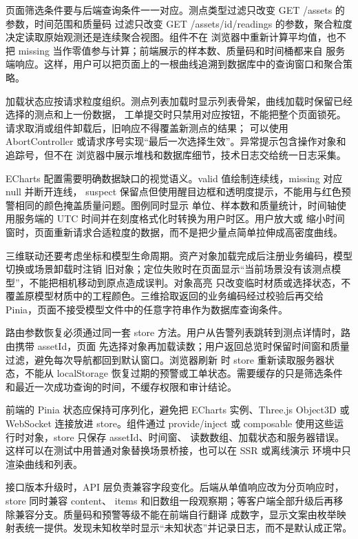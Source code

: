 页面筛选条件要与后端查询条件一一对应。测点类型过滤只改变 GET /assets 的参数，时间范围和质量码
过滤只改变 GET /assets/{id}/readings 的参数，聚合粒度决定读取原始观测还是连续聚合视图。组件不在
浏览器中重新计算平均值，也不把 missing 当作零值参与计算；前端展示的样本数、质量码和时间桶都来自
服务端响应。这样，用户可以把页面上的一根曲线追溯到数据库中的查询窗口和聚合策略。

加载状态应按请求粒度组织。测点列表加载时显示列表骨架，曲线加载时保留已经选择的测点和上一份数据，
工单提交时只禁用对应按钮，不能把整个页面锁死。请求取消或组件卸载后，旧响应不得覆盖新测点的结果；
可以使用 AbortController 或请求序号实现“最后一次选择生效”。异常提示包含操作对象和追踪号，但不在
浏览器中展示堆栈和数据库细节，技术日志交给统一日志采集。

ECharts 配置需要明确数据缺口的视觉语义。valid 值绘制连续线，missing 对应 null 并断开连线，
suspect 保留点但使用醒目边框和透明度提示，不能用与红色预警相同的颜色掩盖质量问题。图例同时显示
单位、样本数和质量统计，时间轴使用服务端的 UTC 时间并在刻度格式化时转换为用户时区。用户放大或
缩小时间窗时，页面重新请求合适粒度的数据，而不是把少量点简单拉伸成高密度曲线。

三维联动还要考虑坐标和模型生命周期。资产对象加载完成后注册业务编码，模型切换或场景卸载时注销
旧对象；定位失败时在页面显示“当前场景没有该测点模型”，不能把相机移动到原点造成误判。对象高亮
只改变临时材质或选择状态，不覆盖原模型材质中的工程颜色。三维拾取返回的业务编码经过校验后再交给
Pinia，页面不接受模型文件中的任意字符串作为数据库查询条件。

路由参数恢复必须通过同一套 store 方法。用户从告警列表跳转到测点详情时，路由携带 assetId，页面
先选择对象再加载读数；用户返回总览时保留时间窗和质量过滤，避免每次导航都回到默认窗口。浏览器刷新
时 store 重新读取服务器状态，不能从 localStorage 恢复过期的预警或工单状态。需要缓存的只是筛选条件
和最近一次成功查询的时间，不缓存权限和审计结论。

前端的 Pinia 状态应保持可序列化，避免把 ECharts 实例、Three.js Object3D 或 WebSocket 连接放进
store。组件通过 provide/inject 或 composable 使用这些运行时对象，store 只保存 assetId、时间窗、
读数数组、加载状态和服务器错误。这样可以在测试中用普通对象替换场景桥接，也可以在 SSR 或离线演示
环境中只渲染曲线和列表。

接口版本升级时，API 层负责兼容字段变化。后端从单值响应改为分页响应时，store 同时兼容 content、
items 和旧数组一段观察期；等客户端全部升级后再移除兼容分支。质量码和预警等级不能在前端自行翻译
成数字，显示文案由枚举映射表统一提供。发现未知枚举时显示“未知状态”并记录日志，而不是默认成正常。

